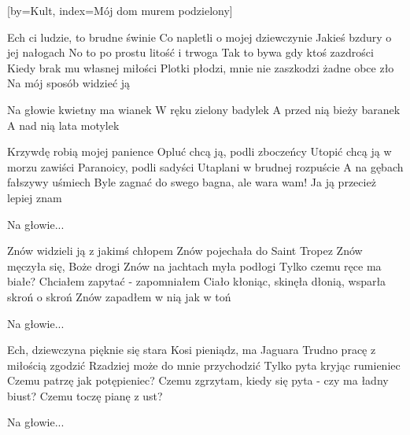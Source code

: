 [by={Kult},
                     index={Mój dom murem podzielony}]
\beginverse

Ech ci ludzie, to brudne świnie
Co napletli o mojej dziewczynie
Jakieś bzdury o jej nałogach
No to po prostu litość i trwoga
Tak to bywa gdy ktoś zazdrości
Kiedy brak mu własnej miłości
Plotki płodzi, mnie nie zaszkodzi żadne obce zło
Na mój sposób widzieć ją

\endverse
\beginverse

Na głowie kwietny ma wianek
W ręku zielony badylek
A przed nią bieży baranek
A nad nią lata motylek

\endverse
\beginverse

Krzywdę robią mojej panience
Opluć chcą ją, podli zboczeńcy
Utopić chcą ją w morzu zawiści
Paranoicy, podli sadyści
Utaplani w brudnej rozpuście
A na gębach fałszywy uśmiech
Byle zagnać do swego bagna, ale wara wam!
Ja ją przecież lepiej znam

\endverse
\beginverse

Na głowie...

\endverse
\beginverse

Znów widzieli ją z jakimś chłopem
Znów pojechała do Saint Tropez
Znów męczyła się, Boże drogi
Znów na jachtach myła podłogi
Tylko czemu ręce ma białe?
Chciałem zapytać - zapomniałem
Ciało kłoniąc, skinęła dłonią, wsparła skroń o skroń
Znów zapadłem w nią jak w toń

\endverse
\beginverse

Na głowie...

\endverse
\beginverse

Ech, dziewczyna pięknie się stara
Kosi pieniądz, ma Jaguara
Trudno pracę z miłością zgodzić
Rzadziej może do mnie przychodzić
Tylko pyta kryjąc rumieniec
Czemu patrzę jak potępieniec?
Czemu zgrzytam, kiedy się pyta - czy ma ładny biust?
Czemu toczę pianę z ust?

\endverse
\beginverse

Na głowie...

\endverse
\endsong